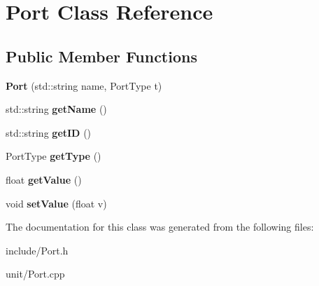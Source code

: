 \hypertarget{classPort}{\section{Port Class Reference}
\label{classPort}
}
\subsection*{Public Member Functions}
\begin{DoxyCompactItemize}
\item 
\hypertarget{classPort_aadff8efe873e31b3362dda2b4a28c8c9}{{\bfseries Port} (std\-::string name, Port\-Type t)}\label{classPort_aadff8efe873e31b3362dda2b4a28c8c9}

\item 
\hypertarget{classPort_ad2c3baf0b291aee3b5b65178231754a6}{std\-::string {\bfseries get\-Name} ()}\label{classPort_ad2c3baf0b291aee3b5b65178231754a6}

\item 
\hypertarget{classPort_a31744528a5ade68a59ce094f3797bc1e}{std\-::string {\bfseries get\-I\-D} ()}\label{classPort_a31744528a5ade68a59ce094f3797bc1e}

\item 
\hypertarget{classPort_a5859f5d788d56c0103f4274b6d62b725}{Port\-Type {\bfseries get\-Type} ()}\label{classPort_a5859f5d788d56c0103f4274b6d62b725}

\item 
\hypertarget{classPort_a101b9cfba62777fb61c35a642b63f25a}{float {\bfseries get\-Value} ()}\label{classPort_a101b9cfba62777fb61c35a642b63f25a}

\item 
\hypertarget{classPort_afc93a217ba756e559c157b66745823a7}{void {\bfseries set\-Value} (float v)}\label{classPort_afc93a217ba756e559c157b66745823a7}

\end{DoxyCompactItemize}


The documentation for this class was generated from the following files\-:\begin{DoxyCompactItemize}
\item 
include/Port.\-h\item 
unit/Port.\-cpp\end{DoxyCompactItemize}
